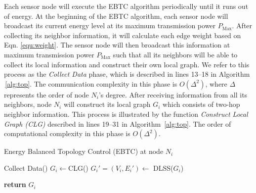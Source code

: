 \documentclass[journal,12pt,onecolumn]{IEEEtran}
\begin{document}
Each sensor node will execute the EBTC algorithm periodically until
it runs out of energy. At the beginning of the EBTC algorithm, each
sensor node will broadcast its current energy level at its maximum
transmission power $P_{\text{Max}}$. After collecting its neighbor
information, it will calculate each edge weight based on
Eqn.\,\,\ref{equ:weight}. The sensor node will then broadcast this
information at maximum transmission power $P_{\text{Max}}$ such
that all its neighbors will be able to collect its local information
and construct their own local graph. We refer to this process as
the {\em Collect Data} phase, which is described in lines 13--18 in
Algorithm \,\ref{alg:top}. The communication complexity in this phase
is $O(\Delta^2)$, where $\Delta$ represents the order of node $N_i$'s
degree. After receiving information from all its neighbors, node $N_i$
will construct its local graph $G_i$ which consists of two-hop
neighbor information. This process is illustrated by the function
{\em Construct Local Graph (CLG)} described in lines 19--31 in
Algorithm \,\ref{alg:top}. The order of computational complexity in
this phase is $O(\Delta^2)$.

\begin{algorithm}[!t]
\caption{Energy Balanced Topology Control (EBTC) at node
$N_i$}\label{alg:top}
\begin{algorithmic}[1]
\State Collect Data()
\State $G_i\leftarrow$CLG()
\State $G_i'=(V_i,E_i')\leftarrow$ DLSS($G_i$)
\EndIf
\EndFor
{}
\Statex

\EndFunction
\Statex

\EndIf
\EndFor
\EndFor
\State\textbf{return} $G_i$
\EndFunction{}
\end{algorithmic}
\end{algorithm}
\end{document}
